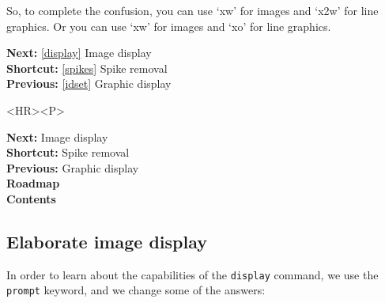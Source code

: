 \documentclass[11pt]{article}
\newenvironment{latexonly}{}{}
\newcommand{\htmlref}[2]{#1}
\newcommand{\xref}[3]{#1}
\newcommand{\xlabel}[1]{}
\begin{document}
   So, to complete the confusion, you can use `xw' for images and `x2w'
   for line graphics. Or you can use `xw' for images and `xo' for line
   graphics.

\begin{latexonly}
{\bf Next:} \ref{display} Image display\\
{\bf Shortcut:} \ref{spikes} Spike removal\\
{\bf Previous:} \ref{idset} Graphic display\\
\end{latexonly}

\begin{htmlonly}
\begin{rawhtml} <HR><P> \end{rawhtml}
{\bf \htmlref{Next:}{display}} Image display\\
{\bf \htmlref{Shortcut:}{spikes}} Spike removal\\
{\bf \htmlref{Previous:}{idset}} Graphic display\\
{\bf \htmlref{Roadmap}{roadmap}}\\
{\bf \htmlref{Contents}{stardoccontents}}\\
\end{htmlonly}


\subsection{\label{display2}\xlabel{display2}Elaborate image display}

   In order to learn about the capabilities of the
{\tt \xref{display}{sun95}{DISPLAY}}
   command, we use the {\tt prompt} keyword, and we change some of
   the answers:
\end{document}
